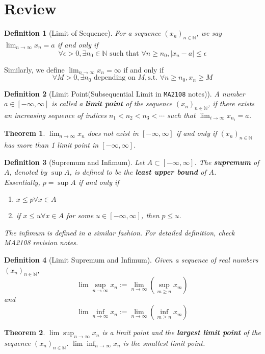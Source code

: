 \documentclass[12pt]{article}
\newtheorem{definition}{Definition}[section]
\newtheorem{theorem}{Theorem}[section]
\theoremstyle{definition}
\begin{document}
\section{Review}
\begin{definition}[Limit of Sequence]
\normalfont For a sequence $(x_n)_{n\in \mathbb{N}}$, we say $\lim_{n\to \infty} x_n = a$ if and only if
\[
\forall \epsilon >0, \exists n_0\in \mathbb{N} \text{ such that }\forall n\geq n_0, |x_n-a|\leq \epsilon
\]
\end{definition}
Similarly, we define $\lim_{n\to \infty} x_n = \infty$ if and only if
\[
\forall M>0, \exists n_0\text{ depending on }M, \text{s.t. }\forall n\geq n_0, x_n\geq M
\]
\begin{definition}[Limit Point(Subsequential Limit in \texttt{MA2108} notes)]
\normalfont A number $a\in[-\infty, \infty]$ is called a \textbf{limit point} of the sequence $(x_n)_{n\in \mathbb{N}}$, if there exists an increasing sequence of indices $n_1<n_2<n_3<\cdots$ such that $\lim_{i\to \infty} x_{n_i} = a$.
\end{definition}
\begin{theorem}
\normalfont $\lim_{n\to \infty}x_n$ does not exist in $[-\infty, \infty]$ if and only if $(x_n)_{n\in \mathbb{N}}$ has more than 1 limit point in $[-\infty, \infty]$.
\end{theorem}
\begin{definition}[Supremum and Infimum]
\normalfont Let $A\subset[-\infty, \infty]$. The \textbf{supremum} of $A$, denoted by $\sup A$, is defined to be the \textbf{least upper bound} of $A$.\\
Essentially, $p = \sup A$ if and only if
\begin{enumerate}
  \item $x\leq p\forall x\in A$
  \item if $x\leq u\forall x\in A$ for some $u\in [-\infty, \infty]$, then $p\leq u$.
\end{enumerate}
The infimum is defined in a similar fashion. For detailed definition, check MA2108 revision notes.
\end{definition}
\begin{definition}[Limit Supremum and Infimum]
\normalfont Given a sequence of real numbers $(x_n)_{n\in \mathbb{N}}$,
\[
\lim\sup_{n\to\infty} x_n :=\lim_{n\to \infty}(\sup_{m\geq n} x_m)
\]
and 
\[
\lim\inf_{n\to\infty} x_n :=\lim_{n\to \infty}(\inf_{m\geq n} x_m)
\]
\end{definition}
\begin{theorem}
\normalfont $\lim\sup_{n\to \infty} x_n$ is a limit point and the \textbf{largest limit point} of the sequence $(x_n)_{n\in \mathbb{N}}$. $\lim\inf_{n\to \infty} x_n$ is the smallest limit point.
\end{theorem}
\end{document}
